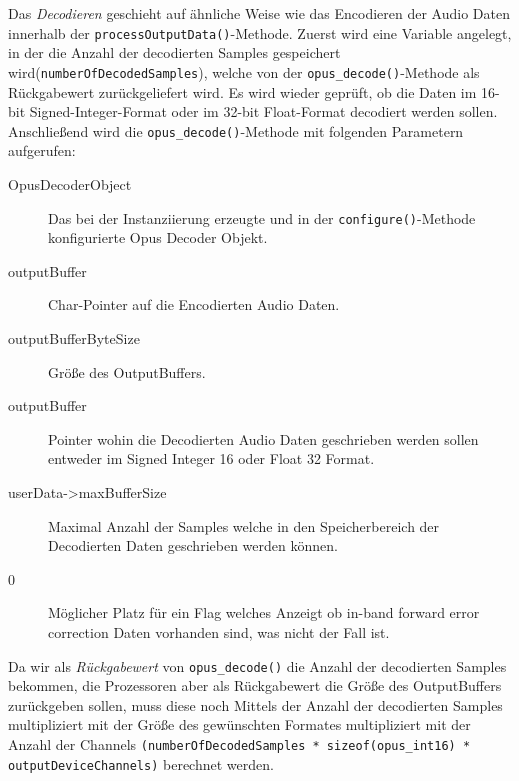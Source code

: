 Das \textit{Decodieren} geschieht auf ähnliche Weise wie das Encodieren der Audio Daten innerhalb der \texttt{processOutputData()}-Methode.
Zuerst wird eine Variable angelegt, in der die Anzahl der decodierten Samples gespeichert wird(\texttt{numberOfDecodedSamples}), welche von der \texttt{opus\_decode()}-Methode als Rückgabewert zurückgeliefert wird. Es wird wieder geprüft, ob die Daten im 16-bit Signed-Integer-Format oder im 32-bit Float-Format decodiert werden sollen. Anschließend wird die \texttt{opus\_decode()}-Methode mit folgenden Parametern aufgerufen:

\begin{description}
\item[OpusDecoderObject] Das bei der Instanziierung erzeugte und in der \texttt{configure()}-Methode konfigurierte Opus Decoder Objekt.
\item[outputBuffer] Char-Pointer auf die Encodierten Audio Daten.
\item[outputBufferByteSize] Größe des OutputBuffers.
\item[outputBuffer] Pointer wohin die Decodierten Audio Daten geschrieben werden sollen entweder im Signed Integer 16 oder Float 32 Format.
\item[userData->maxBufferSize] Maximal Anzahl der Samples welche in den Speicherbereich der Decodierten Daten geschrieben werden können.
\item[0] Möglicher Platz für ein Flag welches Anzeigt ob in-band forward error correction Daten vorhanden sind, was nicht der Fall ist.
\end{description}

Da wir als \textit{Rückgabewert} von \texttt{opus\_decode()} die Anzahl der decodierten Samples bekommen, die Prozessoren aber als Rückgabewert die Größe des OutputBuffers zurückgeben sollen, muss diese noch Mittels der Anzahl der decodierten Samples multipliziert mit der Größe des gewünschten Formates multipliziert mit der Anzahl der Channels \texttt{(numberOfDecodedSamples * sizeof(opus\_int16) * outputDeviceChannels)} berechnet werden.

